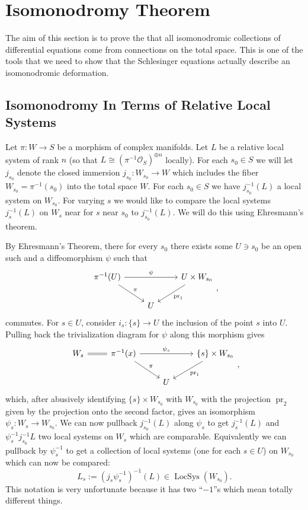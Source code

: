 \documentclass[12pt]{book}
\numberwithin{equation}{section}
\theoremstyle{definition}
\theoremstyle{remark}
\newcommand{\Ocal}{\mathcal{O}}
\newcommand{\LocSys}{\operatorname{LocSys}}
\newcommand{\pr}{\operatorname{pr}}
\begin{document}
\section{Isomonodromy Theorem}

The aim of this section is to prove the that all isomonodromic collections of differential equations come from connections on the total space. 
This is one of the tools that we need to show that the Schlesinger equations actually describe an isomonodromic deformation.

\subsection{Isomonodromy In Terms of Relative Local Systems}
Let $\pi:W\to S$ be a morphism of complex manifolds.
Let $L$ be a relative local system of rank $n$ (so that $L \cong (\pi^{-1}\Ocal_S)^{\oplus n}$ locally).
For each $s_0\in S$ we will let $j_{s_0}$ denote the closed immersion $j_{s_0}\colon W_{s_0} \to W$ which includes the fiber $W_{s_0} = \pi^{-1}(s_0)$ into the total space $W$. 
For each $s_0\in S$ we have $j_{s_0}^{-1}(L)$ a local system on $W_{s_0}$.
For varying $s$ we would like to compare the local systems $j_s^{-1}(L)$ on $W_s$ near for $s$ near $s_0$ to $j_{s_0}^{-1}(L)$. 
We will do this using Ehresmann's theorem.

By Ehresmann's Theorem, there for every $s_0$ there exists some $U  \owns s_0$ be an open such and a diffeomorphism $\psi$ such that 
$$\begin{tikzcd}
\pi^{-1}(U) \ar[rr, "\psi"] \ar[dr, "\pi"] & & U\times W_{s_0} \ar[dl, "\pr_1"]\\
& U &
\end{tikzcd},$$
commutes. 
For $s \in U$, consider $i_s: \lbrace s \rbrace \to U$ the inclusion of the point $s$ into $U$. 
Pulling back the trivialization diagram for $\psi$ along this morphism gives
$$\begin{tikzcd}
W_s \ar[r, equal]& \pi^{-1}(x) \ar[rr, "\psi_s"] \ar[dr, "\pi"] & & \lbrace s \rbrace \times W_{s_0} \ar[dl, "\pr_1"]\\
& & U &
\end{tikzcd},$$
which, after abusively identifying $\lbrace s \rbrace \times W_{s_0}$ with $W_{s_0}$ with the projection $\pr_2$ given by the projection onto the second factor, gives an isomorphism $\psi_s: W_s\to W_{s_0}$. 
We can now pullback $j_{s_0}^{-1}(L)$ along $\psi_s$ to get $j_s^{-1}(L)$ and $\psi_s^{-1} j_{s_0}^{-1}L$ two local systems on $W_s$ which are comparable. 
Equivalently we can pullback by $\psi_s^{-1}$ to get a collection of local systems (one for each $s\in U$) on $W_{s_0}$ which can now be compared:
$$ L_s := ( j_s \psi_s^{-1})^{-1}(L) \in \LocSys(W_{s_0}). $$
This notation is very unfortunate because it has two ``$-1$''s which mean totally different things.
\end{document}
